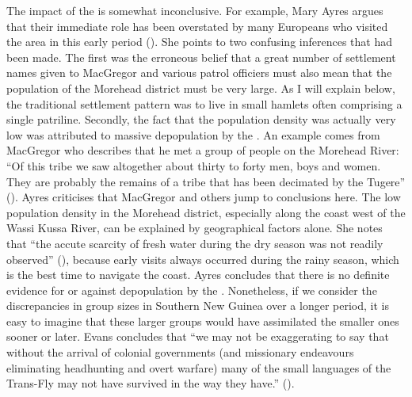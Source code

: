 The impact of the  is somewhat inconclusive. For example, Mary Ayres argues that their immediate role has been overstated by many Europeans who visited the area in this early period (\citeyear[19]{Ayres:ws}). She points to two confusing inferences that had been made. The first was the erroneous belief that a great number of settlement names given to MacGregor and various patrol officiers must also mean that the population of the Morehead district must be very large. As I will explain below, the traditional settlement pattern was to live in small hamlets often comprising a single patriline. Secondly, the fact that the population density was actually very low was attributed to massive depopulation by the . An example comes from MacGregor who describes that he met a group of people on the Morehead River: ``Of this tribe we saw altogether about thirty to forty men, boys and women. They are probably the remains of a tribe that has been decimated by the Tugere'' (\citeyear[74]{MacGregor:1890rep}). Ayres criticises that MacGregor and others jump to conclusions here. The low population density in the Morehead district, especially along the coast west of the Wassi Kussa River, can be explained by geographical factors alone. She notes that ``the accute scarcity of fresh water during the dry season was not readily observed'' (\citeyear[22]{Ayres:ws}), because early visits always occurred during the rainy season, which is the best time to navigate the coast. Ayres concludes that there is no definite evidence for or against depopulation by the . Nonetheless, if we consider the discrepancies in group sizes in Southern New Guinea over a longer period, it is easy to imagine that these larger groups would have assimilated the smaller ones sooner or later. Evans concludes that ``we may not be exaggerating to say that without the arrival of colonial governments (and missionary endeavours eliminating headhunting and overt warfare) many of the small languages of the Trans-Fly may not have survived in the way they have.'' (\citeyear[117]{Evans:2012wp}).

